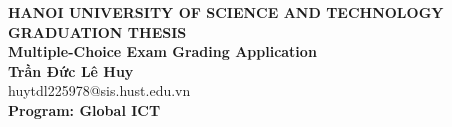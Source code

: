 \documentclass[Main.tex]{subfiles}
\begin{document}
\begin{titlepage}
\thispagestyle{empty}
\begin{center}

{\textbf{\large{HANOI UNIVERSITY OF SCIENCE AND TECHNOLOGY }}}\\[4cm]

{\textbf{\huge{GRADUATION THESIS}}}\\[1cm]
{\textbf{\Large{Multiple-Choice Exam Grading Application}}}\\[1cm]

{\textbf{\large{Trần Đức Lê Huy}}}\\
{\large{huytdl225978@sis.hust.edu.vn}}\\[0.5cm]

{\textbf{\large{Program: Global ICT}}}\\

\vspace{4cm}
\begin{table}[H]
\centering
{}
\end{table}
\end{center}



\end{titlepage}
\end{document}
